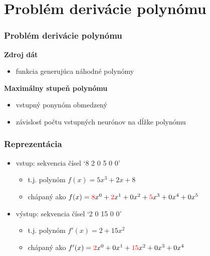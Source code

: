 \documentclass[red]{beamer}
\begin{document}
\section{Problém derivácie polynómu}

\begin{frame}
\frametitle{Problém derivácie polynómu}
\begin{center}
\hspace*{0.5cm}\begin{minipage}{\textwidth}
\textbf{Zdroj dát}
\begin{itemize}
\item funkcia generujúca náhodné polynómy
\end{itemize}
\textbf{Maximálny stupeň polynómu}
\begin{itemize}
\item vstupný ponynóm obmedzený
\item závislosť počtu vstupných neurónov na dĺžke polynómu
\end{itemize}
\end{minipage}
\end{center} 
\end{frame}

\begin{frame}
\begin{center}
\frametitle{Reprezentácia}
\begin{itemize}
\item vstup: sekvencia čísel `8 2 0 5 0 0'
\begin{itemize}
\item t.j. polynóm $f(x)=5x^3 + 2x + 8$
\item chápaný ako $f(x)= {\color{red} 8} x^0 + {\color{red} 2}x^1 + 0x^2 + {\color{red} 5}x^3 + 0x^4 + 0x^5$
\end{itemize}

\vspace*{1cm}

\item výstup: sekvencia čísel `2 0 15 0 0'
\begin{itemize}
\item t.j. polynóm $f'(x)=2 + 15x^2$
\item chápaný ako $f'(x)={\color{red} 2}x^0 + 0x^1 + {\color{red} 15}x^2 + 0x^3 + 0x^4$
\end{itemize}
\end{itemize}
\end{center} 
\end{frame}
\end{document}
